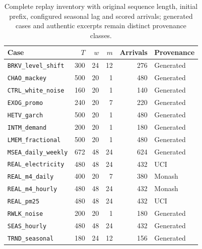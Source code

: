 \begin{table}[htbp]\centering\small
\caption{Complete replay inventory with original sequence length, initial prefix, configured seasonal lag and scored arrivals; generated cases and authentic excerpts remain distinct provenance classes.}\label{tab:replay-cases}
\begin{tabular}{lrrrrl}\toprule
Case & $T$ & $w$ & $m$ & Arrivals & Provenance\\\midrule
\texttt{BRKV\_level\_shift} & 300 & 24 & 12 & 276 & Generated\\
\texttt{CHAO\_mackey} & 500 & 20 & 1 & 480 & Generated\\
\texttt{CTRL\_white\_noise} & 160 & 20 & 1 & 140 & Generated\\
\texttt{EXOG\_promo} & 240 & 20 & 7 & 220 & Generated\\
\texttt{HETV\_garch} & 500 & 20 & 1 & 480 & Generated\\
\texttt{INTM\_demand} & 200 & 20 & 1 & 180 & Generated\\
\texttt{LMEM\_fractional} & 500 & 20 & 1 & 480 & Generated\\
\texttt{MSEA\_daily\_weekly} & 672 & 48 & 24 & 624 & Generated\\
\texttt{REAL\_electricity} & 480 & 48 & 24 & 432 & UCI\\
\texttt{REAL\_m4\_daily} & 400 & 20 & 7 & 380 & Monash\\
\texttt{REAL\_m4\_hourly} & 480 & 48 & 24 & 432 & Monash\\
\texttt{REAL\_pm25} & 480 & 48 & 24 & 432 & UCI\\
\texttt{RWLK\_noise} & 200 & 20 & 1 & 180 & Generated\\
\texttt{SEAS\_hourly} & 480 & 48 & 24 & 432 & Generated\\
\texttt{TRND\_seasonal} & 180 & 24 & 12 & 156 & Generated\\
\bottomrule\end{tabular}\end{table}

